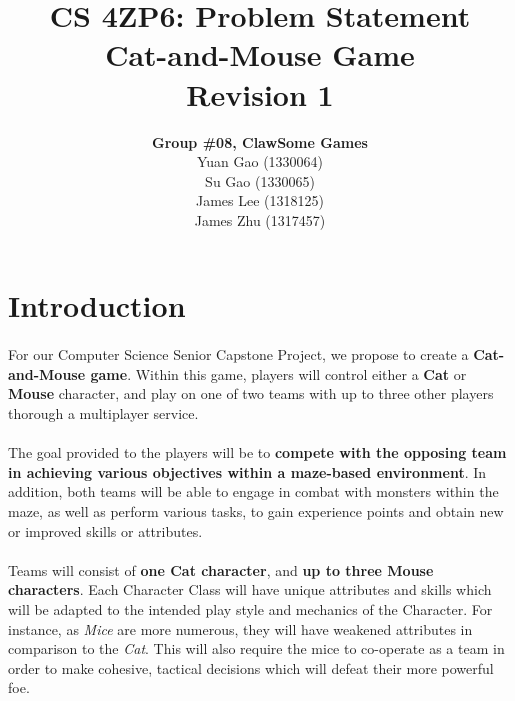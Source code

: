 \documentclass{article}
\title{CS 4ZP6: Problem Statement
\\Cat-and-Mouse Game
\\ Revision 1}
\author{\textbf{Group \#08, ClawSome Games}
		\\ Yuan Gao (1330064)
		\\ Su Gao (1330065)
		\\ James Lee (1318125)
		\\ James Zhu (1317457)
}
\date{\displaydate{date}}
\begin{document}
\maketitle
\newpage
\begin{versionhistory}
\end{versionhistory}

\tableofcontents
\newpage
{}

\section{Introduction}

\paragraph{}For our Computer Science Senior Capstone Project, we propose to create a \textbf{Cat-and-Mouse
game}. Within this game, players will control either a \textbf{Cat} or \textbf{Mouse} character, and play on one of two teams with up to three other players thorough a multiplayer service. 

\paragraph{}The goal provided to the players will be to \textbf{compete with the opposing team in achieving various objectives within a maze-based environment}. In addition, both teams will be able to engage in combat with monsters within the maze, as well as perform various tasks, to gain experience points and obtain new or improved skills or attributes.

\paragraph{}Teams will consist of \textbf{one Cat character}, and \textbf{up to three Mouse characters}. Each Character Class will have unique attributes and skills which will be adapted to the intended play style and mechanics of the Character. For instance, as \emph{Mice} are more numerous, they will have weakened attributes in comparison to the \emph{Cat}. This will also require the mice to co-operate as a team in order to make cohesive, tactical decisions which will defeat their more powerful foe.
\end{document}
